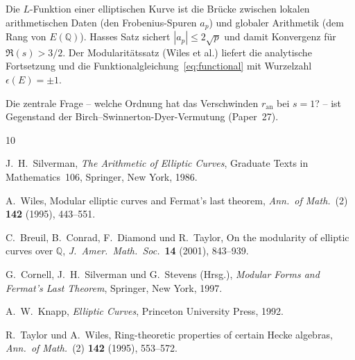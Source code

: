 \documentclass[12pt,a4paper]{amsart}
\theoremstyle{definition}
\newcommand{\Q}{\mathbb{Q}}
\begin{document}
Die $L$-Funktion einer elliptischen Kurve ist die Br\"ucke zwischen lokalen
arithmetischen Daten (den Frobenius-Spuren $a_p$) und globaler Arithmetik
(dem Rang von $E(\Q)$).
Hasses Satz sichert $|a_p| \le 2\sqrt{p}$ und damit Konvergenz f\"ur $\Re(s) > 3/2$.
Der Modularit\"atssatz (Wiles et al.) liefert die analytische Fortsetzung
und die Funktionalgleichung~\eqref{eq:functional} mit Wurzelzahl $\epsilon(E) = \pm 1$.

Die zentrale Frage -- welche Ordnung hat das Verschwinden $r_{\mathrm{an}}$
bei $s = 1$? -- ist Gegenstand der Birch--Swinnerton-Dyer-Vermutung (Paper~27).

\begin{thebibliography}{10}

J.~H.~Silverman,
\emph{The Arithmetic of Elliptic Curves},
Graduate Texts in Mathematics~106,
Springer, New York, 1986.

A.~Wiles,
Modular elliptic curves and Fermat's last theorem,
\emph{Ann.\ of Math.}\ (2) \textbf{142} (1995), 443--551.

C.~Breuil, B.~Conrad, F.~Diamond und R.~Taylor,
On the modularity of elliptic curves over $\Q$,
\emph{J.\ Amer.\ Math.\ Soc.}\ \textbf{14} (2001), 843--939.

G.~Cornell, J.~H.~Silverman und G.~Stevens (Hrsg.),
\emph{Modular Forms and Fermat's Last Theorem},
Springer, New York, 1997.

A.~W.~Knapp,
\emph{Elliptic Curves},
Princeton University Press, 1992.

R.~Taylor und A.~Wiles,
Ring-theoretic properties of certain Hecke algebras,
\emph{Ann.\ of Math.}\ (2) \textbf{142} (1995), 553--572.

\end{thebibliography}
\end{document}
